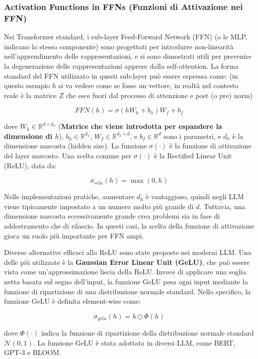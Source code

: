 \subsubsection{Activation Functions in FFNs (Funzioni di Attivazione nei FFN)}
Nei Transformer standard, i sub-layer Feed-Forward Network (FFN) (o le MLP, indicano lo stesso componente) sono progettati per introdurre non-linearità nell'apprendimento delle rappresentazioni, e si sono dimostrati utili per prevenire la degenerazione delle rappresentazioni apprese dalla self-attention. La forma standard del FFN utilizzato in questi sub-layer può essere espressa come:
(in questo esempio $h$ si va vedere come se fosse un vettore, in realtà nel contesto reale è la matrice $Z$ che esce fuori dal processo di attenzione e post (o pre) norm)

$$FFN(h) = \sigma(hW_h + b_h)W_f + b_f$$


dove $W_h \in \mathbb{R}^{d \times d_h}$ (\textbf{Matrice che viene introdotta per espandere la dimensione di $h$}), $b_h \in \mathbb{R}^{d_h}$, $W_f \in \mathbb{R}^{d_h \times d}$, e $b_f \in \mathbb{R}^d$ sono i parametri, e $d_h$ è la dimensione nascosta (hidden size). La funzione $\sigma(\cdot)$ è la funzione di attivazione del layer nascosto. Una scelta comune per $\sigma(\cdot)$ è la Rectified Linear Unit (ReLU), data da:


$$\sigma_{relu}(h) = \max(0, h)$$


Nelle implementazioni pratiche, aumentare $d_h$ è vantaggioso, quindi negli LLM viene tipicamente impostato a un numero molto più grande di $d$. Tuttavia, una dimensione nascosta eccessivamente grande crea problemi sia in fase di addestramento che di rilascio. In questi casi, la scelta della funzione di attivazione gioca un ruolo più importante per FFN ampi.

Diverse alternative efficaci alla ReLU sono state proposte nei moderni LLM. Una delle più utilizzate è la \textbf{Gaussian Error Linear Unit (GeLU)}, che può essere vista come un'approssimazione liscia della ReLU. Invece di applicare una soglia netta basata sul segno dell'input, la funzione GeLU pesa ogni input mediante la funzione di ripartizione di una distribuzione normale standard. Nello specifico, la funzione GeLU è definita element-wise come:


$$\sigma_{gelu}(h) = h \odot \Phi(h)$$


dove $\Phi(\cdot)$ indica la funzione di ripartizione della distribuzione normale standard $\mathcal{N}(0,1)$. La funzione GeLU è stata adottata in diversi LLM, come BERT, GPT-3 e BLOOM.

